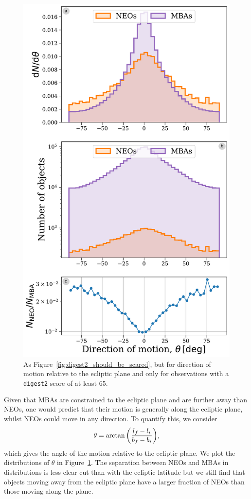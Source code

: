 \documentclass[twocolumn, twocolappendix]{aastex631}
\newcommand{\dig}{\texttt{digest2}}
\begin{document}
\begin{figure}[htb]
    \centering
    \includegraphics[width=\columnwidth]{figures/direction_dist_highscore.pdf}
    \caption{As Figure~\ref{fig:digest2_should_be_scared}, but for direction of motion relative to the ecliptic plane and only for observations with a \dig{} score of at least 65.}
    \label{fig:dir_highscore}
\end{figure}

Given that MBAs are constrained to the ecliptic plane and are further away than NEOs, one would predict that their motion is generally along the ecliptic plane, whilst NEOs could move in any direction. To quantify this, we consider
\begin{equation}
    \theta = \arctan \qty( \frac{l_f - l_i}{b_f - b_i} ),
\end{equation}
which gives the angle of the motion relative to the ecliptic plane. We plot the distributions of $\theta$ in Figure~\ref{fig:dir_highscore}. The separation between NEOs and MBAs in distributions is less clear cut than with the ecliptic latitude but we still find that objects moving away from the ecliptic plane have a larger fraction of NEOs than those moving along the plane.
\end{document}
